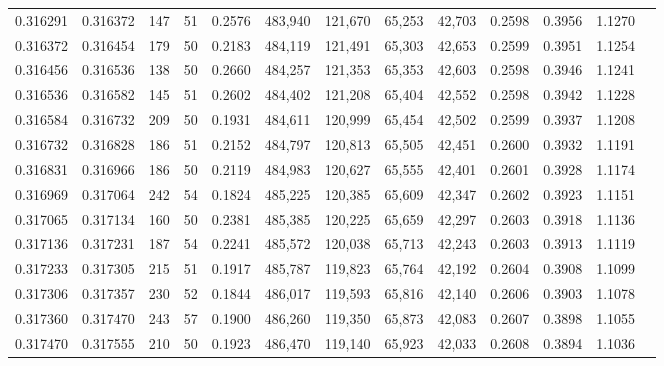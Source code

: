 \begin{tabular}{rrrrrrrrrrrrr}
0.316291 & 0.316372 &   147 &  51 &                                     0.2576 & 483,940 & 121,670 &  65,253 &  42,703 & 0.2598 & 0.3956 & 1.1270 \\
0.316372 & 0.316454 &   179 &  50 &                                     0.2183 & 484,119 & 121,491 &  65,303 &  42,653 & 0.2599 & 0.3951 & 1.1254 \\
0.316456 & 0.316536 &   138 &  50 &                                     0.2660 & 484,257 & 121,353 &  65,353 &  42,603 & 0.2598 & 0.3946 & 1.1241 \\
0.316536 & 0.316582 &   145 &  51 &                                     0.2602 & 484,402 & 121,208 &  65,404 &  42,552 & 0.2598 & 0.3942 & 1.1228 \\
0.316584 & 0.316732 &   209 &  50 &                                     0.1931 & 484,611 & 120,999 &  65,454 &  42,502 & 0.2599 & 0.3937 & 1.1208 \\
0.316732 & 0.316828 &   186 &  51 &                                     0.2152 & 484,797 & 120,813 &  65,505 &  42,451 & 0.2600 & 0.3932 & 1.1191 \\
0.316831 & 0.316966 &   186 &  50 &                                     0.2119 & 484,983 & 120,627 &  65,555 &  42,401 & 0.2601 & 0.3928 & 1.1174 \\
0.316969 & 0.317064 &   242 &  54 &                                     0.1824 & 485,225 & 120,385 &  65,609 &  42,347 & 0.2602 & 0.3923 & 1.1151 \\
0.317065 & 0.317134 &   160 &  50 &                                     0.2381 & 485,385 & 120,225 &  65,659 &  42,297 & 0.2603 & 0.3918 & 1.1136 \\
0.317136 & 0.317231 &   187 &  54 &                                     0.2241 & 485,572 & 120,038 &  65,713 &  42,243 & 0.2603 & 0.3913 & 1.1119 \\
0.317233 & 0.317305 &   215 &  51 &                                     0.1917 & 485,787 & 119,823 &  65,764 &  42,192 & 0.2604 & 0.3908 & 1.1099 \\
0.317306 & 0.317357 &   230 &  52 &                                     0.1844 & 486,017 & 119,593 &  65,816 &  42,140 & 0.2606 & 0.3903 & 1.1078 \\
0.317360 & 0.317470 &   243 &  57 &                                     0.1900 & 486,260 & 119,350 &  65,873 &  42,083 & 0.2607 & 0.3898 & 1.1055 \\
0.317470 & 0.317555 &   210 &  50 &                                     0.1923 & 486,470 & 119,140 &  65,923 &  42,033 & 0.2608 & 0.3894 & 1.1036 \\

\end{tabular}
